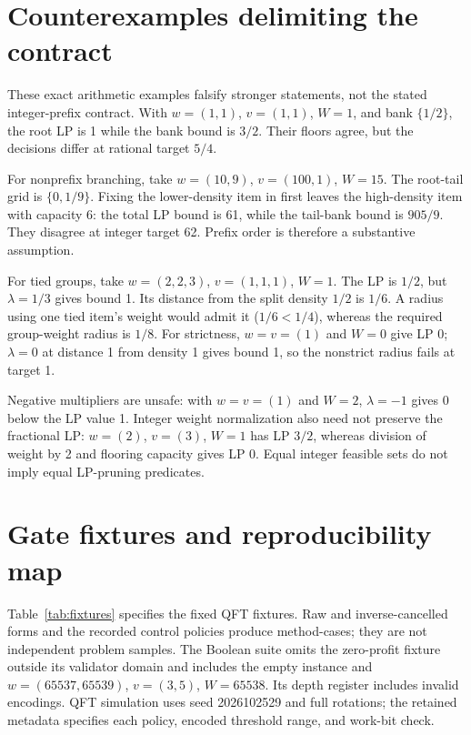 \documentclass[referee,pdflatex,sn-mathphys-num]{sn-jnl}
\theoremstyle{thmstyleone}
\theoremstyle{thmstyletwo}
\begin{document}
\appendix
\section{Counterexamples delimiting the contract}\label{app:counterexamples}
These exact arithmetic examples falsify stronger statements, not the stated integer-prefix contract. With $w=(1,1)$, $v=(1,1)$, $W=1$, and bank $\{1/2\}$, the root LP is 1 while the bank bound is $3/2$. Their floors agree, but the decisions differ at rational target $5/4$.

For nonprefix branching, take $w=(10,9)$, $v=(100,1)$, $W=15$. The root-tail grid is $\{0,1/9\}$. Fixing the lower-density item in first leaves the high-density item with capacity 6: the total LP bound is 61, while the tail-bank bound is $905/9$. They disagree at integer target 62. Prefix order is therefore a substantive assumption.

For tied groups, take $w=(2,2,3)$, $v=(1,1,1)$, $W=1$. The LP is $1/2$, but $\lambda=1/3$ gives bound 1. Its distance from the split density $1/2$ is $1/6$. A radius using one tied item's weight would admit it ($1/6<1/4$), whereas the required group-weight radius is $1/8$. For strictness, $w=v=(1)$ and $W=0$ give LP 0; $\lambda=0$ at distance 1 from density 1 gives bound 1, so the nonstrict radius fails at target 1.

Negative multipliers are unsafe: with $w=v=(1)$ and $W=2$, $\lambda=-1$ gives 0 below the LP value 1. Integer weight normalization also need not preserve the fractional LP: $w=(2)$, $v=(3)$, $W=1$ has LP $3/2$, whereas division of weight by 2 and flooring capacity gives LP 0. Equal integer feasible sets do not imply equal LP-pruning predicates.

\section{Gate fixtures and reproducibility map}\label{app:reproduce}
Table~\ref{tab:fixtures} specifies the fixed QFT fixtures. Raw and inverse-cancelled forms and the recorded control policies produce method-cases; they are not independent problem samples. The Boolean suite omits the zero-profit fixture outside its validator domain and includes the empty instance and $w=(65537,65539)$, $v=(3,5)$, $W=65538$. Its depth register includes invalid encodings. QFT simulation uses seed 2026102529 and full rotations; the retained metadata specifies each policy, encoded threshold range, and work-bit check.
\end{document}
